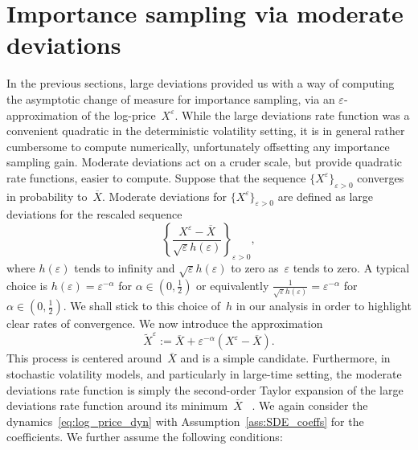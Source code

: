 \documentclass{amsart}[11pt]
\numberwithin{equation}{section}
\numberwithin{theorem}{subsection}
\numberwithin{proposition}{subsection}
\numberwithin{definition}{subsection}
\numberwithin{lemma}{subsection}
\numberwithin{assumption}{subsection}
\newcommand{\eps}{\varepsilon}
\begin{document}
\section{Importance sampling via moderate deviations}\label{sec:MDP_IS}
In the previous sections, 
large deviations provided us with a way of computing the asymptotic change of measure for importance sampling, 
via an $\eps$-approximation of the log-price~$X^{\eps}$.
While the large deviations rate function
was a convenient quadratic in the deterministic volatility setting, 
it is in general rather cumbersome to compute numerically, 
unfortunately offsetting any importance sampling gain. 
Moderate deviations act on a cruder scale, but provide quadratic rate functions, 
easier to compute.
Suppose that the sequence $\{X^{\eps}\}_{\eps>0}$ converges in probability to~$\overline{X}$. 
Moderate deviations for $\{X^{\eps}\}_{\eps>0}$ are defined as large deviations for 
the rescaled sequence 
$$
\left\{\frac{X^{\eps} - \overline{X}}{\sqrt{\eps}h(\eps)}
\right\}_{\eps>0},
$$
where $h(\eps)$ tends to infinity 
and $\sqrt{\eps}h(\eps)$ to zero
as~$\eps$ tends to zero. 
A typical choice is $h(\eps) = \eps^{-\alpha}$ for $\alpha \in (0,\frac{1}{2})$ or equivalently $\frac{1}{\sqrt{\eps}h(\eps)} = \eps^{-\alpha}$ for $\alpha\in(0,\frac{1}{2})$. 
We shall stick to this choice of~$h$ 
in our analysis in order to highlight clear rates of convergence.
We now introduce the approximation
\begin{equation}\label{eq:MDPSmallNoiseGeneral}
\widetilde{X}^{\eps} := \overline{X} + 
\eps^{-\alpha}\left(X^{\eps} - \overline{X}\right).
\end{equation}
This process is centered around~$\overline{X}$ and is a simple candidate. 
Furthermore, in stochastic volatility models, and particularly in large-time setting, the moderate deviations rate function is simply the second-order Taylor expansion of the large deviations rate function around its minimum~$\overline{X}$ ~\cite[Remark 3.5]{Jacquier2019}. 
We again consider the dynamics~\eqref{eq:log_price_dyn}
with Assumption~\ref{ass:SDE_coeffs} for the coefficients. 
We further assume the following conditions:
\end{document}
